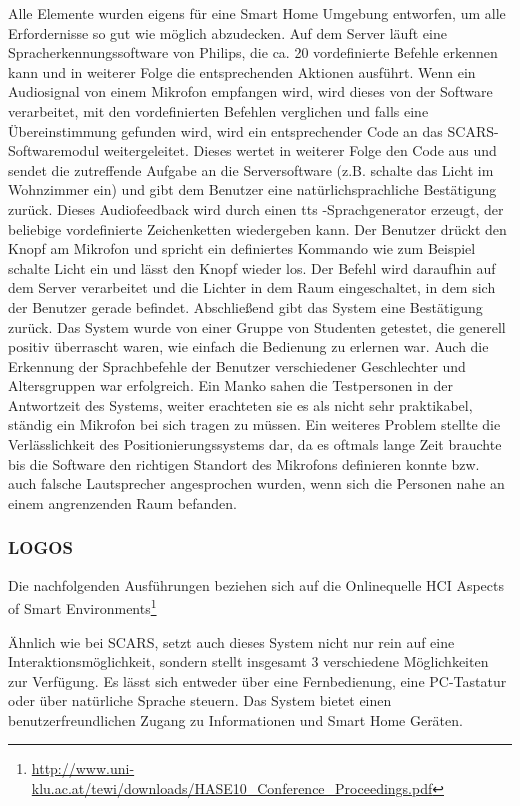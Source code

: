 Alle Elemente wurden eigens für eine Smart Home Umgebung entworfen, um alle Erfordernisse so
gut wie möglich abzudecken. Auf dem Server läuft eine Spracherkennungssoftware von Philips, die
ca. 20 vordefinierte Befehle erkennen kann und in weiterer Folge die entsprechenden Aktionen
ausführt.
Wenn ein Audiosignal von einem Mikrofon empfangen wird, wird dieses von der Software verarbeitet, mit den vordefinierten Befehlen verglichen und falls eine Übereinstimmung gefunden wird, wird ein entsprechender Code an das SCARS-Softwaremodul weitergeleitet. Dieses wertet in weiterer Folge den Code aus und sendet die zutreffende Aufgabe an die Serversoftware (z.B. schalte das Licht im Wohnzimmer ein) und gibt dem Benutzer eine natürlichsprachliche Bestätigung zurück.
Dieses Audiofeedback wird durch einen \gls{tts} -Sprachgenerator erzeugt, der beliebige vordefinierte Zeichenketten wiedergeben kann.
Der Benutzer drückt den Knopf am Mikrofon und spricht ein definiertes Kommando wie zum Beispiel
\glqq schalte Licht ein\grqq{} und lässt den Knopf wieder los. Der Befehl wird daraufhin auf dem Server verarbeitet und die Lichter in dem Raum eingeschaltet, in dem sich der Benutzer gerade befindet. Abschließend gibt das System eine Bestätigung zurück.
Das System wurde von einer Gruppe von Studenten getestet, die generell positiv überrascht waren, wie einfach die Bedienung zu erlernen war. Auch die Erkennung der Sprachbefehle der Benutzer verschiedener Geschlechter und Altersgruppen war erfolgreich. Ein Manko sahen die Testpersonen in der Antwortzeit des Systems, weiter erachteten sie es als nicht sehr praktikabel, ständig ein Mikrofon bei sich tragen zu müssen. Ein weiteres Problem stellte die Verlässlichkeit des Positionierungssystems dar, da es oftmals lange Zeit brauchte bis die Software den richtigen Standort des Mikrofons definieren konnte bzw. auch falsche Lautsprecher angesprochen wurden, wenn sich die Personen nahe an einem angrenzenden Raum befanden.

\subsubsection{LOGOS}

Die nachfolgenden Ausführungen beziehen sich auf die Onlinequelle \glqq HCI Aspects of Smart Environments\grqq\footnote{\url{http://www.uni-klu.ac.at/tewi/downloads/HASE10_Conference_Proceedings.pdf}}

Ähnlich wie bei SCARS, setzt auch dieses System nicht nur rein auf eine Interaktionsmöglichkeit, sondern stellt insgesamt 3 verschiedene Möglichkeiten zur Verfügung. Es lässt sich entweder über eine Fernbedienung, eine PC-Tastatur oder über natürliche Sprache steuern. Das System bietet einen benutzerfreundlichen Zugang zu Informationen und Smart Home Geräten.

